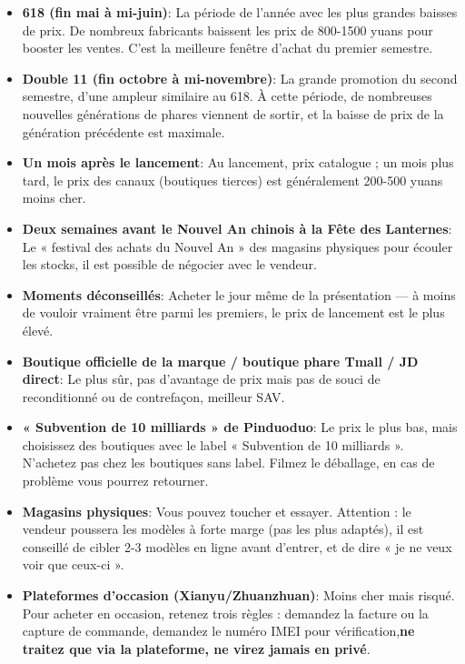 \begin{itemize}
  \item \textbf{618 (fin mai à mi-juin)}: La période de l'année avec les plus grandes baisses de prix. De nombreux fabricants baissent les prix de 800-1500 yuans pour booster les ventes. C'est la meilleure fenêtre d'achat du premier semestre.
  \item \textbf{Double 11 (fin octobre à mi-novembre)}: La grande promotion du second semestre, d'une ampleur similaire au 618. À cette période, de nombreuses nouvelles générations de phares viennent de sortir, et la baisse de prix de la génération précédente est maximale.
  \item \textbf{Un mois après le lancement}: Au lancement, prix catalogue ; un mois plus tard, le prix des canaux (boutiques tierces) est généralement 200-500 yuans moins cher.
  \item \textbf{Deux semaines avant le Nouvel An chinois à la Fête des Lanternes}: Le « festival des achats du Nouvel An » des magasins physiques pour écouler les stocks, il est possible de négocier avec le vendeur.
  \item \textbf{Moments déconseillés}: Acheter le jour même de la présentation — à moins de vouloir vraiment être parmi les premiers, le prix de lancement est le plus élevé.
\end{itemize}


\begin{itemize}
  \item \textbf{Boutique officielle de la marque / boutique phare Tmall / JD direct}: Le plus sûr, pas d'avantage de prix mais pas de souci de reconditionné ou de contrefaçon, meilleur SAV.
  \item \textbf{« Subvention de 10 milliards » de Pinduoduo}: Le prix le plus bas, mais choisissez des boutiques avec le label « Subvention de 10 milliards ». N'achetez pas chez les boutiques sans label. Filmez le déballage, en cas de problème vous pourrez retourner.
  \item \textbf{Magasins physiques}: Vous pouvez toucher et essayer. Attention : le vendeur poussera les modèles à forte marge (pas les plus adaptés), il est conseillé de cibler 2-3 modèles en ligne avant d'entrer, et de dire « je ne veux voir que ceux-ci ».
  \item \textbf{Plateformes d'occasion (Xianyu/Zhuanzhuan)}: Moins cher mais risqué. Pour acheter en occasion, retenez trois règles : demandez la facture ou la capture de commande, demandez le numéro IMEI pour vérification,\textbf{ne traitez que via la plateforme, ne virez jamais en privé}.
\end{itemize}

